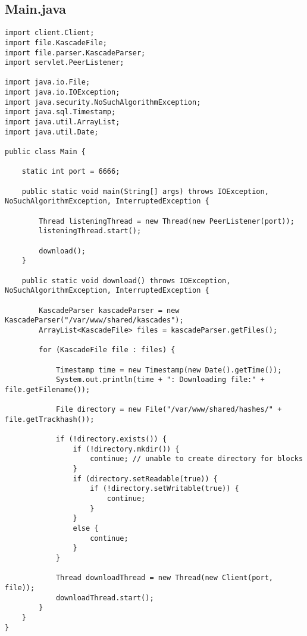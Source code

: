 \documentclass{acm_proc_article-sp}
\begin{document}
\subsection{Main.java}
\begin{lstlisting}
import client.Client;
import file.KascadeFile;
import file.parser.KascadeParser;
import servlet.PeerListener;

import java.io.File;
import java.io.IOException;
import java.security.NoSuchAlgorithmException;
import java.sql.Timestamp;
import java.util.ArrayList;
import java.util.Date;

public class Main {

    static int port = 6666;

    public static void main(String[] args) throws IOException, NoSuchAlgorithmException, InterruptedException {

        Thread listeningThread = new Thread(new PeerListener(port));
        listeningThread.start();

        download();
    }

    public static void download() throws IOException, NoSuchAlgorithmException, InterruptedException {

        KascadeParser kascadeParser = new KascadeParser("/var/www/shared/kascades");
        ArrayList<KascadeFile> files = kascadeParser.getFiles();

        for (KascadeFile file : files) {

            Timestamp time = new Timestamp(new Date().getTime());
            System.out.println(time + ": Downloading file:" + file.getFilename());

            File directory = new File("/var/www/shared/hashes/" + file.getTrackhash());

            if (!directory.exists()) {
                if (!directory.mkdir()) {
                    continue; // unable to create directory for blocks
                }
                if (directory.setReadable(true)) {
                    if (!directory.setWritable(true)) {
                        continue;
                    }
                }
                else {
                    continue;
                }
            }

            Thread downloadThread = new Thread(new Client(port, file));
            downloadThread.start();
        }
    }
}
\end{lstlisting}
\end{document}
